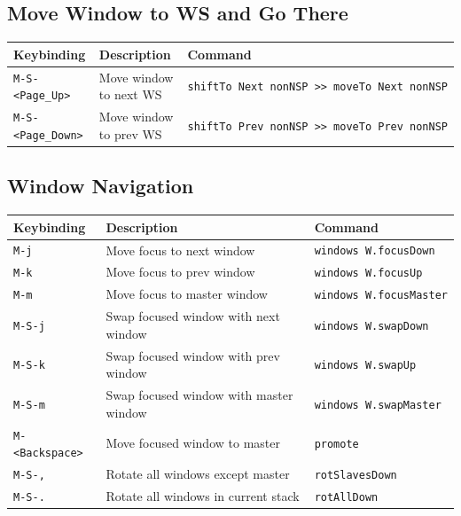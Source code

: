\hypertarget{move-window-to-ws-and-go-there}{%
\subsection{Move Window to WS and Go
There}\label{move-window-to-ws-and-go-there}}

\begin{longtable}[]{@{}
  >{\raggedright\arraybackslash}p{}
  >{\raggedright\arraybackslash}p{}
  >{\raggedright\arraybackslash}p{}@{}}
\toprule
Keybinding & Description & Command \\
\midrule
\endhead
\texttt{M-S-\textless{}Page\_Up\textgreater{}} & Move window to next WS
&
\texttt{shiftTo\ Next\ nonNSP\ \textgreater{}\textgreater{}\ moveTo\ Next\ nonNSP} \\
\texttt{M-S-\textless{}Page\_Down\textgreater{}} & Move window to prev
WS &
\texttt{shiftTo\ Prev\ nonNSP\ \textgreater{}\textgreater{}\ moveTo\ Prev\ nonNSP} \\
\bottomrule
\end{longtable}

\hypertarget{window-navigation}{%
\subsection{Window Navigation}\label{window-navigation}}

\begin{longtable}[]{@{}lll@{}}
\toprule
Keybinding & Description & Command \\
\midrule
\endhead
\texttt{M-j} & Move focus to next window &
\texttt{windows\ W.focusDown} \\
\texttt{M-k} & Move focus to prev window &
\texttt{windows\ W.focusUp} \\
\texttt{M-m} & Move focus to master window &
\texttt{windows\ W.focusMaster} \\
\texttt{M-S-j} & Swap focused window with next window &
\texttt{windows\ W.swapDown} \\
\texttt{M-S-k} & Swap focused window with prev window &
\texttt{windows\ W.swapUp} \\
\texttt{M-S-m} & Swap focused window with master window &
\texttt{windows\ W.swapMaster} \\
\texttt{M-\textless{}Backspace\textgreater{}} & Move focused window to
master & \texttt{promote} \\
\texttt{M-S-,} & Rotate all windows except master &
\texttt{rotSlavesDown} \\
\texttt{M-S-.} & Rotate all windows in current stack &
\texttt{rotAllDown} \\
\bottomrule
\end{longtable}


